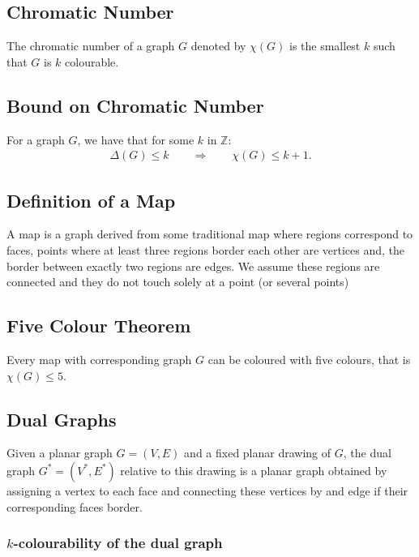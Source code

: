 \documentclass[a4paper, 12pt, twoside]{article}
\begin{document}
\subsection{Chromatic Number}

The chromatic number of a graph $G$ denoted by $\chi(G)$ is the smallest 
$k$ such that $G$ is $k$ colourable.

\subsection{Bound on Chromatic Number}

For a graph $G$, we have that for some $k$ in $\mathbb{Z}$: \begin{gather*}
  \Delta(G) \leq k \qquad \Rightarrow \qquad \chi(G) \leq k + 1.
\end{gather*}

\subsection{Definition of a Map}

A map is a graph derived from some traditional map where regions correspond to faces,
points where at least three regions border each other are vertices and, the border between
exactly two regions are edges. We assume these regions are connected and they do not touch
solely at a point (or several points)

\subsection{Five Colour Theorem}

Every map with corresponding graph $G$ can be coloured with five colours, 
that is $\chi(G) \leq 5$.

\subsection{Dual Graphs}

Given a planar graph $G = (V, E)$ and a fixed planar drawing of $G$, the dual graph
$G^* = (V^*, E^*)$ relative to this drawing is a planar graph obtained by assigning
a vertex to each face and connecting these vertices by and edge if their corresponding
faces border.

\subsubsection{$k$-colourability of the dual graph}
\end{document}
